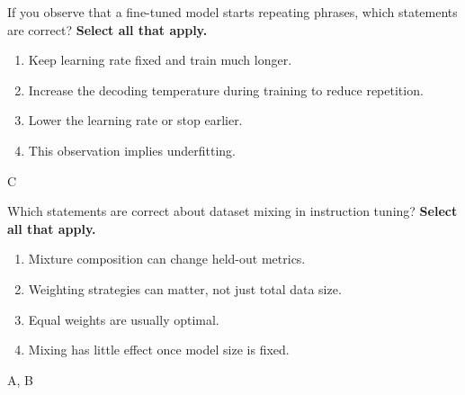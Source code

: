 \question[4]
If you observe that a fine-tuned model starts repeating phrases, which  statements are correct? \textbf{Select all that apply.}
\begin{enumerate}
\item Keep learning rate fixed and train much longer.
\item Increase the decoding temperature during training to reduce repetition.
\item Lower the learning rate or stop earlier.
\item This observation implies underfitting.
\end{enumerate}
\begin{soln}
C
\end{soln}


\question[4]
Which statements are correct about dataset mixing in instruction tuning? \textbf{Select all that apply.}
\begin{enumerate}
\item Mixture composition can change held-out metrics.
\item Weighting strategies can matter, not just total data size.
\item Equal weights are usually optimal.
\item Mixing has little effect once model size is fixed.
\end{enumerate}
\begin{soln}
A, B
\end{soln}



